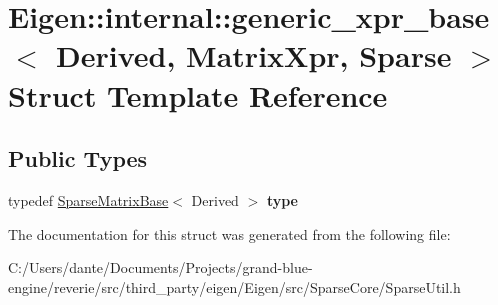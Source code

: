 \hypertarget{struct_eigen_1_1internal_1_1generic__xpr__base_3_01_derived_00_01_matrix_xpr_00_01_sparse_01_4}{}\section{Eigen\+::internal\+::generic\+\_\+xpr\+\_\+base$<$ Derived, Matrix\+Xpr, Sparse $>$ Struct Template Reference}
\label{struct_eigen_1_1internal_1_1generic__xpr__base_3_01_derived_00_01_matrix_xpr_00_01_sparse_01_4}
\subsection*{Public Types}
\begin{DoxyCompactItemize}
\item 
\mbox{\label{struct_eigen_1_1internal_1_1generic__xpr__base_3_01_derived_00_01_matrix_xpr_00_01_sparse_01_4_ac470fe1f432775711644edc7fd42d6e2}} 
typedef \mbox{\hyperlink{class_eigen_1_1_sparse_matrix_base}{Sparse\+Matrix\+Base}}$<$ Derived $>$ {\bfseries type}
\end{DoxyCompactItemize}


The documentation for this struct was generated from the following file\+:\begin{DoxyCompactItemize}
\item 
C\+:/\+Users/dante/\+Documents/\+Projects/grand-\/blue-\/engine/reverie/src/third\+\_\+party/eigen/\+Eigen/src/\+Sparse\+Core/Sparse\+Util.\+h\end{DoxyCompactItemize}

